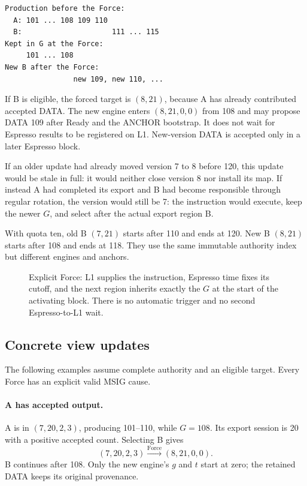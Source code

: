 \documentclass[11pt,a4paper]{article}
\begin{document}
\begin{center}\small
\begin{verbatim}
Production before the Force:
  A: 101 ... 108 109 110
  B:                     111 ... 115
Kept in G at the Force:
     101 ... 108
New B after the Force:
                new 109, new 110, ...
\end{verbatim}
\end{center}

If B is eligible, the forced target is $(8,21)$, because A has already
contributed accepted DATA. The new engine enters $(8,21,0,0)$ from 108 and
may propose DATA 109 after Ready and the ANCHOR bootstrap. It does not
wait for Espresso results to be registered on L1. New-version DATA is
accepted only in a later Espresso block.

If an older update had already moved version 7 to 8 before 120, this
update would be stale in full: it would neither close version 8 nor
install its map. If instead A had completed its export and B had become
responsible through regular rotation, the version would still be 7: the
instruction would execute, keep the newer $G$, and select after the
actual export region B.

With quota ten, old B $(7,21)$ starts after 110 and ends at 120. New B
$(8,21)$ starts after 108 and ends at 118. They use the same immutable
authority index but different engines and anchors.

\begin{figure}[p]\centering

\caption{Explicit Force: L1 supplies the instruction, Espresso time fixes
its cutoff, and the next region inherits exactly the $G$ at the start of
the activating block. There is no automatic trigger and no second
Espresso-to-L1 wait.}
\label{fig:forced-cross-region}
\end{figure}
\FloatBarrier

\subsection{Concrete view updates}
\label{sec:force-view-examples}
The following examples assume complete authority and an eligible target.
Every Force has an explicit valid MSIG cause.

\paragraph{A has accepted output.}
A is in $(7,20,2,3)$, producing 101--110, while $G=108$. Its export
session is 20 with a positive accepted count. Selecting B gives
\[
 (7,20,2,3)\xrightarrow{\mathrm{Force}}(8,21,0,0).
\]
B continues after 108. Only the new engine's $g$ and $t$ start at zero;
the retained DATA keeps its original provenance.
\end{document}
